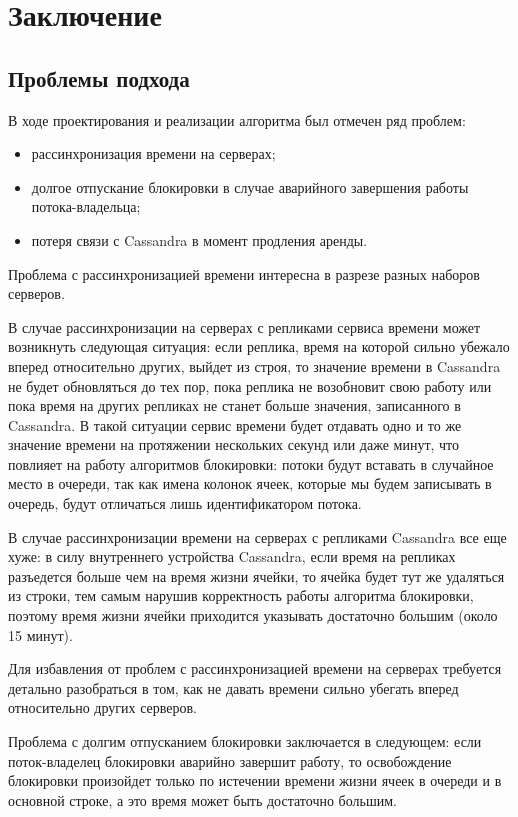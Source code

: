 \section{Заключение}

\subsection{Проблемы подхода}

В ходе проектирования и реализации алгоритма был отмечен ряд проблем:

\begin{itemize}
	\item рассинхронизация времени на серверах;
	\item долгое отпускание блокировки в случае аварийного завершения работы потока-владельца;
	\item потеря связи с Cassandra в момент продления аренды.
\end{itemize}

Проблема с рассинхронизацией времени интересна в разрезе разных наборов серверов.

В случае рассинхронизации на серверах с репликами сервиса времени может возникнуть следующая ситуация: если реплика, время на которой сильно убежало вперед относительно других, выйдет из строя, то значение времени в Cassandra не будет обновляться до тех пор, пока реплика не возобновит свою работу или пока время на других репликах не станет больше значения, записанного в Cassandra. В такой ситуации сервис времени будет отдавать одно и то же значение времени на протяжении нескольких секунд или даже минут, что повлияет на работу алгоритмов блокировки: потоки будут вставать в случайное место в очереди, так как имена колонок ячеек, которые мы будем записывать в очередь, будут отличаться лишь идентификатором потока.

В случае рассинхронизации времени на серверах с репликами Cassandra все еще хуже: в силу внутреннего устройства Cassandra, если время на репликах разъедется больше чем на время жизни ячейки, то ячейка будет тут же удаляться из строки, тем самым нарушив корректность работы алгоритма блокировки, поэтому время жизни ячейки приходится указывать достаточно большим (около 15 минут).

Для избавления от проблем с рассинхронизацией времени на серверах требуется детально разобраться в том, как не давать времени сильно убегать вперед относительно других серверов.

Проблема с долгим отпусканием блокировки заключается в следующем: если поток-владелец блокировки аварийно завершит работу, то освобождение блокировки произойдет только по истечении времени жизни ячеек в очереди и в основной строке, а это время может быть достаточно большим.

